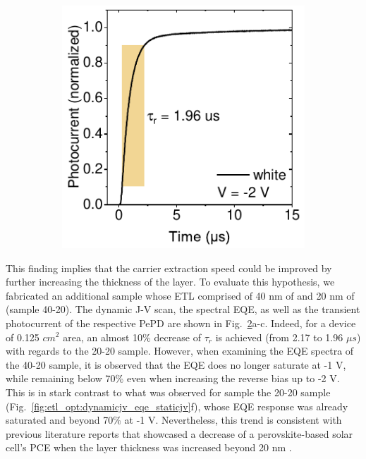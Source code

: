 \begin{figure}[htbp]
\begin{subfigure}{0.32\textwidth}
        \caption{}
        \label{}
    \end{subfigure}
    \hfill
    \begin{subfigure}{0.3\textwidth}
        \centering
        \includegraphics[width=\textwidth]{chapters/transport_layers/images/40C60-20TiO2-rise.pdf}
        \caption{}
    \end{subfigure}
    
    \caption{}
    \label{fig:etl_opt:40C60_20TiO2}
\end{figure}



This finding implies that the carrier extraction speed could be improved by further increasing the thickness of the  layer. To evaluate this hypothesis, we fabricated an additional sample whose ETL comprised of 40 nm of  and 20 nm of  (sample 40-20). The dynamic J-V scan, the spectral EQE, as well as the transient photocurrent of the respective PePD are shown in Fig.~\ref{fig:etl_opt:40C60_20TiO2}a-c. Indeed, for a device of 0.125 $cm^2$ area, an almost 10\% decrease of $\tau_r$ is achieved (from 2.17 to 1.96 $\mu s$) with regards to the 20-20 sample. However, when examining the EQE spectra of the 40-20 sample, it is observed that the EQE does no longer saturate at -1 V, while remaining below 70\% even when increasing the reverse bias up to -2 V. This is in stark contrast to what was observed for sample the 20-20 sample (Fig.~\ref{fig:etl_opt:dynamicjv_eqe_staticjv}f), whose EQE response was already saturated and beyond 70\% at -1 V. Nevertheless, this trend is consistent with previous literature reports that showcased a decrease of a perovskite-based solar cell's PCE when the  layer thickness was increased beyond 20 nm \cite{Klipfel2022C60Layer}.


